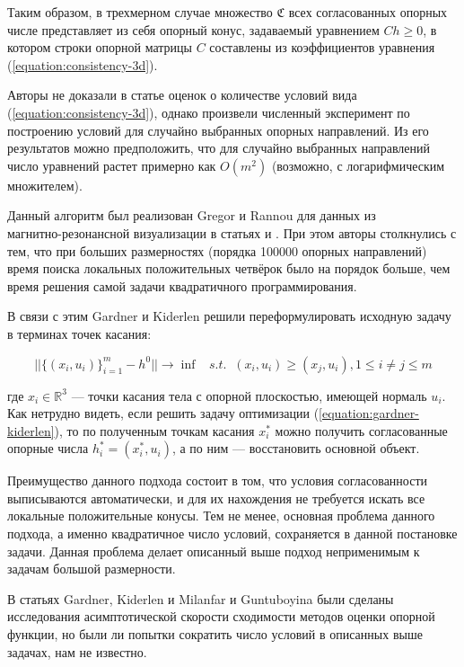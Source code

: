 \documentclass[a4paper, 10pt]{article}
\theoremstyle{definition}
\theoremstyle{plain}
\theoremstyle{plain}
\begin{document}
Таким образом, в трехмерном случае множество $\mathfrak{C}$ всех согласованных
опорных числе представляет из себя опорный конус, задаваемый уравнением
$C h \geq 0$, в котором строки опорной матрицы $C$ составлены из коэффициентов
уравнения (\ref{equation:consistency-3d}).

Авторы не доказали в статье оценок о количестве условий вида
(\ref{equation:consistency-3d}), однако произвели численный эксперимент по
построению условий для случайно выбранных опорных направлений. Из его
результатов можно предположить, что для случайно выбранных направлений число
уравнений растет примерно как $O(m^{2})$ (возможно, с логарифмическим
множителем).

Данный алгоритм был реализован Gregor и Rannou для данных из \\
магнитно-резонансной визуализации в статьях \cite{IMA:IMA10007} и
\cite{doi:10.1117/12.431168}. При этом авторы столкнулись с тем, что при больших
размерностях (порядка 100000 опорных направлений) время поиска локальных
положительных четвёрок было на порядок больше, чем время решения самой задачи
квадратичного программирования.

В связи с этим Gardner и Kiderlen \cite{4586384} решили переформулировать
исходную задачу в терминах точек касания:

\begin{equation}
\label{equation:gardner-kiderlen}
 ||\{(x_{i}, u_{i})\}_{i = 1}^{m} - h^{0}|| \to \inf \;\;\; s. t. \;\;
 (x_{i}, u_{i}) \geq (x_{j}, u_{i}), 1 \leq i \neq j \leq m
\end{equation}

где $x_{i} \in \mathbb{R}^{3}$ --- точки касания тела с опорной плоскостью,
имеющей нормаль $u_{i}$. Как нетрудно видеть, если решить задачу оптимизации
(\ref{equation:gardner-kiderlen}), то по полученным точкам касания $x^{*}_{i}$
можно получить согласованные опорные числа $h^{*}_{i} = (x^{*}_{i}, u_{i})$, а
по ним --- восстановить основной объект.

Преимущество данного подхода состоит в том, что условия согласованности
выписываются автоматически, и для их нахождения не требуется искать все
локальные положительные конусы. Тем не менее, основная проблема данного подхода,
а именно квадратичное число условий, сохраняется в данной постановке задачи.
Данная проблема делает описанный выше подход неприменимым к задачам большой
размерности.

В статьях Gardner, Kiderlen и Milanfar \cite{Gardner06convergenceof} и
Guntuboyina \cite{Guntuboyina2012} были сделаны исследования асимптотической
скорости сходимости методов оценки опорной функции, но были ли попытки сократить
число условий в описанных выше задачах, нам не известно.
\end{document}
